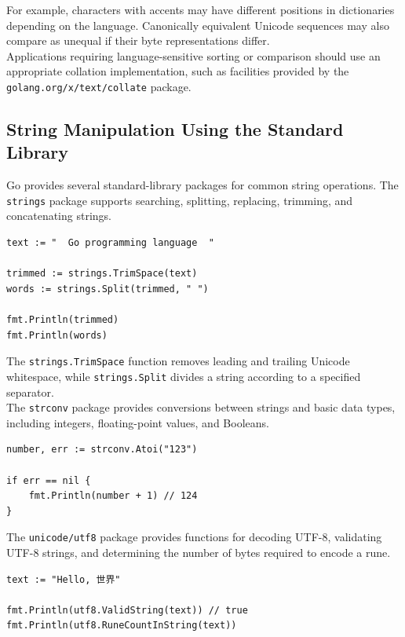 For example, characters with accents may have different positions in dictionaries depending on the language. Canonically equivalent Unicode sequences may also compare as unequal if their byte representations differ.\\

Applications requiring language-sensitive sorting or comparison should use an appropriate collation implementation, such as facilities provided by the \texttt{golang.org/x/text/collate} package.

\subsection{String Manipulation Using the Standard Library}

Go provides several standard-library packages for common string operations. The \texttt{strings} package supports searching, splitting, replacing, trimming, and concatenating strings.

\begin{lstlisting}
text := "  Go programming language  "

trimmed := strings.TrimSpace(text)
words := strings.Split(trimmed, " ")

fmt.Println(trimmed)
fmt.Println(words)
\end{lstlisting}

The \texttt{strings.TrimSpace} function removes leading and trailing Unicode whitespace, while \texttt{strings.Split} divides a string according to a specified separator.\\

The \texttt{strconv} package provides conversions between strings and basic data types, including integers, floating-point values, and Booleans.\\

\begin{lstlisting}
number, err := strconv.Atoi("123")

if err == nil {
    fmt.Println(number + 1) // 124
}
\end{lstlisting}

The \texttt{unicode/utf8} package provides functions for decoding UTF-8, validating UTF-8 strings, and determining the number of bytes required to encode a rune.

\begin{lstlisting}
text := "Hello, 世界"

fmt.Println(utf8.ValidString(text)) // true
fmt.Println(utf8.RuneCountInString(text))
\end{lstlisting}

